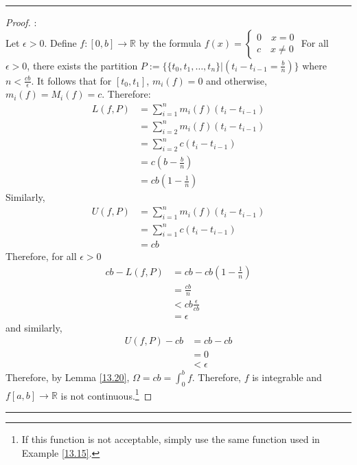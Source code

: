 \documentclass[openany, amssymb, psamsfonts]{amsart}
\newcommand{\bbR}{\mathbb{R}}
\theoremstyle{definition}
\numberwithin{equation}{section}
\begin{document}
\vspace{4pt}     \hrule   \vspace{4pt} \begin{proof}:\\
Let $\epsilon>0$.
    Define $f: [0,b] \to \bbR$ by the formula $f(x) = \begin{cases}
        0 \quad x = 0\\
        c \quad x \neq 0
    \end{cases}$ 
    For all $\epsilon>0$, there exists the partition $P:=\{\{t_0, t_1, \dots, t_n\}|(t_i - t_{i-1} = \frac{b}{n})\}$ where $n<\frac{cb}{\epsilon}$. It follows that for $[t_0, t_1]$, $m_i(f) = 0$ and otherwise, $m_i(f) = M_i(f) = c$. Therefore:
    \begin{align*}
        L(f,P) &= \sum_{i=1}^nm_i(f)(t_{i}- t_{i-1})\\
               &= \sum_{i=2}^{n}m_i(f)(t_i - t_{i-1})\\
               &= \sum_{i=2}^nc(t_i-t_{i-1})\\
               &= c(b-\frac{b}{n})\\
               &= cb(1-\frac{1}{n})
    \end{align*}
    Similarly, 
    \begin{align*}
        U(f,P) &= \sum_{i=1}^nm_i(f)(t_{i}- t_{i-1})\\
               &= \sum_{i=1}^nc(t_i-t_{i-1})\\
               &= cb
    \end{align*}
Therefore, for all $\epsilon>0$
\begin{align*}
                cb - L(f,P) &= cb -  cb(1-\frac{1}{n})\\
               &= \frac{cb}{n}\\
               &< cb\frac{\epsilon}{cb}\\
               &= \epsilon
\end{align*}
and similarly,
\begin{align*}
    U(f,P) - cb &= cb - cb\\
               &= 0\\
               &< \epsilon
\end{align*}
Therefore, by Lemma \ref{13.20}, $\Omega = cb = \int_0^bf$. Therefore, $f$ is integrable and $f[a,b]\to \bbR$ is not continuous.\footnote{If this function is not acceptable, simply use the same function used in Example \ref{13.15}.}  
\end{proof}\vspace{4pt}     \hrule   \vspace{4pt} 
\end{document}
